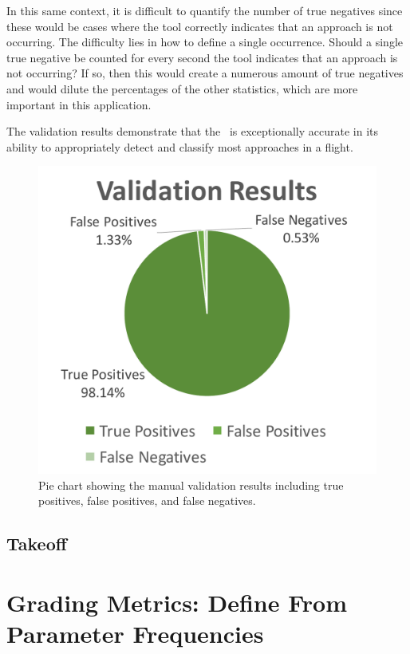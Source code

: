         In this same context, it is difficult to quantify the number of true negatives since these would be cases where the tool correctly indicates that an approach is not occurring.  The difficulty lies in how to define a single occurrence.  Should a single true negative be counted for every second the tool indicates that an approach is not occurring?  If so, then this would create a numerous amount of true negatives and would dilute the percentages of the other statistics, which are more important in this application.

        The validation results demonstrate that the \toolname\ is exceptionally accurate in its ability to appropriately detect and classify most approaches in a flight.

        \begin{figure}
            \centering
            \includegraphics[width=0.5\linewidth]{img/validation_results}
            \caption{Pie chart showing the manual validation results including true positives, false positives, and false negatives.}
            \label{fig:validation_results}
        \end{figure}
        
        
    \subsection{Takeoff}
    
    
    
\section{Grading Metrics:  Define From Parameter Frequencies}

